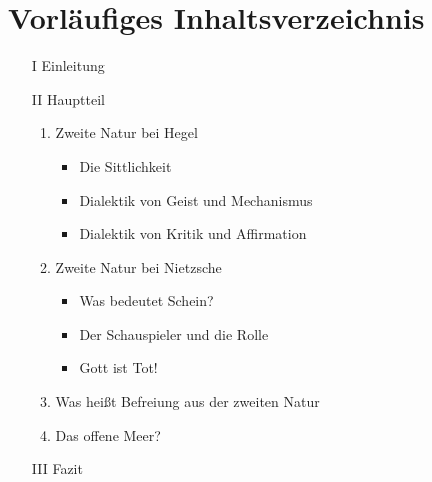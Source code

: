 \documentclass[a4paper, 12pt]{article}
\begin{document}
\section{Vorläufiges Inhaltsverzeichnis}
\begin{itemize}
    \item[I] Einleitung

    \item[II] Hauptteil
    \begin{enumerate}
        \item Zweite Natur bei Hegel
            \begin{itemize}
                \item Die Sittlichkeit
                \item Dialektik von Geist und Mechanismus
                \item Dialektik von Kritik und Affirmation
            \end{itemize}
        \item Zweite Natur bei Nietzsche
            \begin{itemize}
                \item Was bedeutet Schein?
                \item Der Schauspieler und die Rolle
                \item Gott ist Tot!
            \end{itemize}
        \item Was heißt Befreiung aus der zweiten Natur
        \item Das offene Meer?
    \end{enumerate}
    
    \item[III] Fazit
\end{itemize}


    
\printbibliography
 
\end{document}
